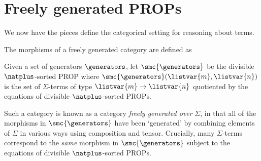 \section{Freely generated PROPs}

We now have the pieces define the categorical setting for reasoning
about terms.

The morphisms of a freely generated category are defined as

\begin{definition}\label{def:freely-generated-prop}
    Given a set of generators \(\generators\), let \(\smc{\generators}\) be the
    divisible \(\natplus\)-sorted PROP where
    \(\smc{\generators}(\listvar{m}, \listvar{n})\) is the set of
    \(\Sigma\)-terms of type \(\listvar{m} \to \listvar{n}\) quotiented by
    the equations of divisible \(\natplus\)-sorted PROPs.
\end{definition}

Such a category is known as a category \emph{freely generated over}
\(\Sigma\), in that all of the morphisms in \(\smc{\generators}\) have been
`generated' by combining elements of \(\Sigma\) in various ways using
composition and tensor.
Crucially, many \(\Sigma\)-terms correspond to the \emph{same} morphism in
\(\smc{\generators}\)
subject to the
equations of divisible \(\natplus\)-sorted PROPs.
